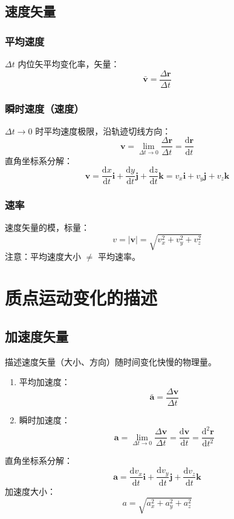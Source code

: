     \subsection{速度矢量}
    \subsubsection{平均速度}
    $\Delta t$ 内位矢平均变化率，矢量：
    \[
    \bar{\boldsymbol{v}} = \frac{\Delta\boldsymbol{r}}{\Delta t}
    \]

    \subsubsection{瞬时速度（速度）}
    $\Delta t \to 0$ 时平均速度极限，沿轨迹切线方向：
    \[
    \boldsymbol{v} = \lim_{\Delta t \to 0}\frac{\Delta\boldsymbol{r}}{\Delta t} = \frac{\mathrm{d}\boldsymbol{r}}{\mathrm{d}t}
    \]
    直角坐标系分解：
    \[
    \boldsymbol{v} = \frac{\mathrm{d}x}{\mathrm{d}t}\boldsymbol{i} + \frac{\mathrm{d}y}{\mathrm{d}t}\boldsymbol{j} + \frac{\mathrm{d}z}{\mathrm{d}t}\boldsymbol{k} = v_x\boldsymbol{i}+v_y\boldsymbol{j}+v_z\boldsymbol{k}
    \]

    \subsubsection{速率}
    速度矢量的模，标量：
    \[
    v = |\boldsymbol{v}| = \sqrt{v_x^2+v_y^2+v_z^2}
    \]
    注意：平均速度大小 $\neq$ 平均速率。

\section{质点运动变化的描述}
    \subsection{加速度矢量}
    描述速度矢量（大小、方向）随时间变化快慢的物理量。
    \begin{enumerate}
        \item 平均加速度：
        \[
        \bar{\boldsymbol{a}} = \frac{\Delta\boldsymbol{v}}{\Delta t}
        \]
        \item 瞬时加速度：
        \[
        \boldsymbol{a} = \lim_{\Delta t \to 0}\frac{\Delta\boldsymbol{v}}{\Delta t} = \frac{\mathrm{d}\boldsymbol{v}}{\mathrm{d}t} = \frac{\mathrm{d}^2\boldsymbol{r}}{\mathrm{d}t^2}
        \]
    \end{enumerate}
    直角坐标系分解：
    \[
    \boldsymbol{a} = \frac{\mathrm{d}v_x}{\mathrm{d}t}\boldsymbol{i} + \frac{\mathrm{d}v_y}{\mathrm{d}t}\boldsymbol{j} + \frac{\mathrm{d}v_z}{\mathrm{d}t}\boldsymbol{k}
    \]
    加速度大小：
    \[
    a = \sqrt{a_x^2+a_y^2+a_z^2}
    \]

